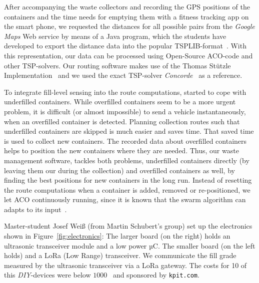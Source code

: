 \documentclass[10pt]{article}
\begin{document}
After accompanying
the waste collectors and recording the GPS positions of the containers and the time needs 
for emptying them with a fitness tracking app on the smart phone, we requested the
distances for all possible pairs from the {\it Google Maps} Web service by means of a 
Java program, which the students have developed to export the distance data into the
popular TSPLIB-format~\cite{tsplib90}. With this representation, our data can be 
processed using Open-Source ACO-code and other TSP-solvers. Our routing software makes
use of the Thomas St{\"u}tzle Implementation~\cite{Dorigo97} and we used the exact 
TSP-solver {\it Concorde}~\cite{applegate01} as a reference. 


To integrate fill-level sensing into the route computations, started to cope with
underfilled containers. While overfilled containers seem to be 
a more urgent problem, it is difficult (or almost impossible) to send a vehicle  
instantaneously, when an overfilled container is detected. Planning collection 
routes such that underfilled containers are skipped is much easier and saves time.
That saved time is used to collect new containers. The recorded data about
overfilled containers helps to position the new containers where they are needed.
Thus, our waste management software, tackles both problems, underfilled containers directly
(by leaving them our during the collection) and overfilled containers as well, 
by finding the best positions for new containers in the long run. Instead of
resetting the route computations when a container is added, removed or 
re-positioned, we let ACO continuously running, since it is known that the 
swarm algorithm can adapts to its input~\cite{angus2005}.

Master-student Josef Wei{\ss} (from Martin Schubert's group) set up the electronics
shown in Figure~\ref{fig:electronics}: The larger board (on the right) holds an ultrasonic transceiver module and a low power µC. The smaller board (on the left holds) and a 
LoRa (Low Range) transceiver. We communicate the fill grade measured by the 
ultrasonic transceiver via a LoRa gateway. The costs for 10 of this {\it DIY}-devices 
were below $1000$~\EUR{} and sponsored by {\tt kpit.com}.
\end{document}
